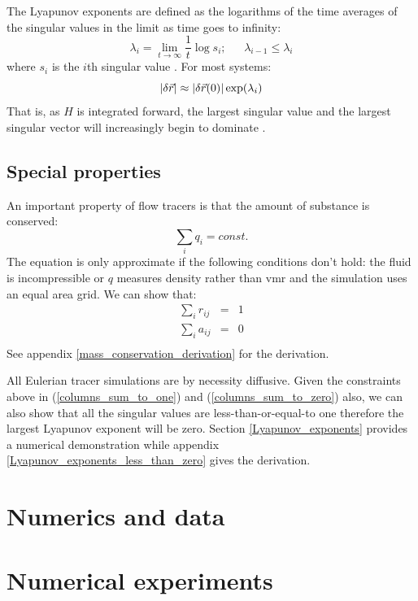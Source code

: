 \documentclass{article}
\begin{document}
The Lyapunov exponents are defined as the logarithms of the time averages
of the singular values in the limit as time goes to infinity:
\begin{equation}
\lambda_i = \lim_{t \rightarrow \infty} \frac{1}{t} \log s_i;
~~~~~~~\lambda_{i-1} \le \lambda_i
\end{equation}
where $s_i$ is the $i$th singular value \citep{Ott1993}.
For most systems:
\begin{equation}
|\delta \vec r| \approx |\delta \vec r(0) | \exp(\lambda_i)
\label{lambda1}
\end{equation}
That is, as $H$ is integrated forward, the largest singular value and
the largest singular vector will increasingly begin to dominate
\citep{Ott1993}.

\subsection{Special properties}

An important property of flow tracers is that the amount of substance is 
conserved:
\begin{equation}
\sum_i q_i = const.
\end{equation}
The equation is only approximate if the following conditions don't hold:
the fluid is incompressible or $q$ measures
density rather than vmr and the simulation uses an equal area grid. 
We can show that:
\begin{eqnarray}
\sum_i r_{ij} & = & 1 
\label{columns_sum_to_one}\\
\sum_i a_{ij} & = & 0
\label{columns_sum_to_zero}\\
\end{eqnarray}
See appendix \ref{mass_conservation_derivation} for the derivation.

All Eulerian tracer simulations are by necessity diffusive. 
Given the constraints above in (\ref{columns_sum_to_one}) and
(\ref{columns_sum_to_zero}) also, 
we can also show that all the singular values are less-than-or-equal-to one
therefore the largest Lyapunov exponent will be zero.
Section \ref{Lyapunov_exponents} provides a numerical demonstration while 
appendix \ref{Lyapunov_exponents_less_than_zero} gives the derivation.

\section{Numerics and data}

\section{Numerical experiments}
\end{document}
